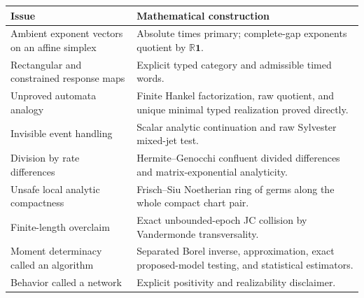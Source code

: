 \documentclass[11pt]{article}
\newcommand{\one}{\mathbf 1}
\newcommand{\R}{\mathbb R}
\begin{document}
\begingroup
\small
\begin{longtable}{@{}>{\raggedright\arraybackslash}p{}>{\raggedright\arraybackslash}p{}@{}}
\toprule
Issue & Mathematical construction \\
\midrule
Ambient exponent vectors on an affine simplex & Absolute times primary; complete-gap exponents quotient by $\R\one$. \\
Rectangular and constrained response maps & Explicit typed category and admissible timed words. \\
Unproved automata analogy & Finite Hankel factorization, raw quotient, and unique minimal typed realization proved directly. \\
Invisible event handling & Scalar analytic continuation and raw Sylvester mixed-jet test. \\
Division by rate differences & Hermite--Genocchi confluent divided differences and matrix-exponential analyticity. \\
Unsafe local analytic compactness & Frisch--Siu Noetherian ring of germs along the whole compact chart pair. \\
Finite-length overclaim & Exact unbounded-epoch JC collision by Vandermonde transversality. \\
Moment determinacy called an algorithm & Separated Borel inverse, approximation, exact proposed-model testing, and statistical estimators. \\
Behavior called a network & Explicit positivity and realizability disclaimer. \\
\bottomrule
\end{longtable}
\endgroup



\end{document}
